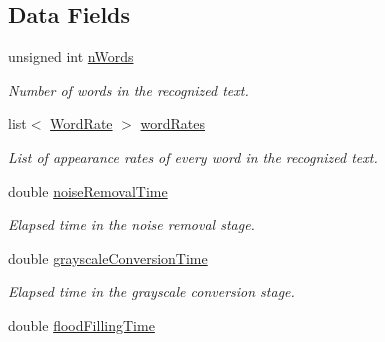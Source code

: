 \subsection*{Data Fields}
\begin{CompactItemize}
\item 
\hypertarget{struct_statistics_b8aec77e19e962544468c569a8333d15}{
unsigned int \hyperlink{struct_statistics_b8aec77e19e962544468c569a8333d15}{nWords}}
\label{struct_statistics_b8aec77e19e962544468c569a8333d15}

\begin{CompactList}\small\item\em Number of words in the recognized text. \item\end{CompactList}\item 
\hypertarget{struct_statistics_9b9e40f4e10eb492830fa6f7ebd56273}{
list$<$ \hyperlink{struct_word_rate}{WordRate} $>$ \hyperlink{struct_statistics_9b9e40f4e10eb492830fa6f7ebd56273}{wordRates}}
\label{struct_statistics_9b9e40f4e10eb492830fa6f7ebd56273}

\begin{CompactList}\small\item\em List of appearance rates of every word in the recognized text. \item\end{CompactList}\item 
\hypertarget{struct_statistics_4a194feb4de2fc619d311b2adb2a7e74}{
double \hyperlink{struct_statistics_4a194feb4de2fc619d311b2adb2a7e74}{noiseRemovalTime}}
\label{struct_statistics_4a194feb4de2fc619d311b2adb2a7e74}

\begin{CompactList}\small\item\em Elapsed time in the noise removal stage. \item\end{CompactList}\item 
\hypertarget{struct_statistics_fc22ca2705714cfc44c45c772475c1cb}{
double \hyperlink{struct_statistics_fc22ca2705714cfc44c45c772475c1cb}{grayscaleConversionTime}}
\label{struct_statistics_fc22ca2705714cfc44c45c772475c1cb}

\begin{CompactList}\small\item\em Elapsed time in the grayscale conversion stage. \item\end{CompactList}\item 
\hypertarget{struct_statistics_6c2cd48482d1de181cb2dd32b3315449}{
double \hyperlink{struct_statistics_6c2cd48482d1de181cb2dd32b3315449}{floodFillingTime}}
\label{struct_statistics_6c2cd48482d1de181cb2dd32b3315449}


\end{CompactItemize}
